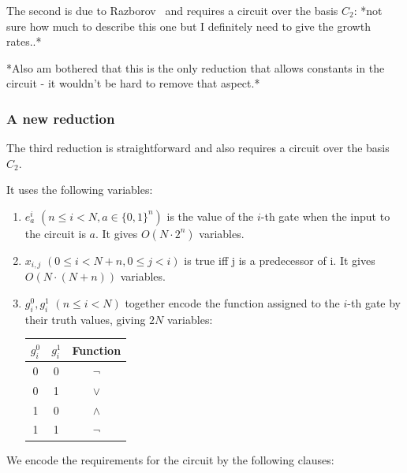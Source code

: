 \documentclass{article}
\begin{document}
The second is due to Razborov~\cite{raz} and requires a circuit over the basis \(C_2\): *not sure how much to describe this one but I definitely need to give the growth rates..*

*Also am bothered that this is the only reduction that allows constants in the circuit - it wouldn't be hard to remove that aspect.*

\subsubsection{A new reduction}

The third reduction is straightforward and also requires a circuit over the basis \(C_2\).

It uses the following variables:

\begin{enumerate}
  \item \(e^i_a\) \((n \leq i < N, a\in\{0,1\}^n)\) is the value of the \(i\)-th gate when the input to the circuit is \(a\). It gives \(O(N\cdot 2^n)\) variables.
  \item \(x_{i,j}\) \(( 0 \leq i < N+n,0 \leq j < i)\) is true iff j is a predecessor of i. It gives \(O(N\cdot (N+n))\) variables.
  \item \(g^0_i, g^1_i\) \((n \leq i < N)\) together encode the function assigned to the \(i\)-th gate by their truth values, giving \(2N\) variables:

    \begin{center}
    \begin{tabular}{ |c|c|c| }
    \hline
    \(g^0_i\) & \(g^1_i\) & Function \\ 
    \hline
    0 & 0 & \(\neg\) \\  
    0 & 1 & \(\lor\) \\ 
    1 & 0 & \(\land\) \\ 
    1 & 1 & \(\neg\) \\   
    \hline
    \end{tabular}
    \end{center}

\end{enumerate}

We encode the requirements for the circuit by the following clauses:
\end{document}
